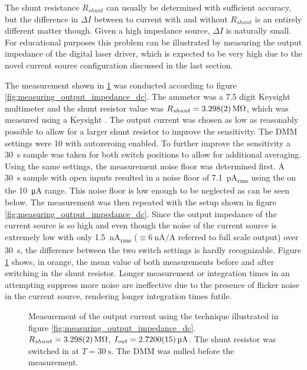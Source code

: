 The shunt resistance $R_{shunt}$ can usually be determined with sufficient accuracy, but the difference in $\Delta I$ between to current with and without $R_{shunt}$ is an entirely different matter though. Given a high impedance source, $\Delta I$ is naturally small. For educational purposes this problem can be illustrated by measuring the output impedance of the digital laser driver, which is expected to be very high due to the novel current source configuration discussed in the last section.

The measurement shown in \ref{fig:dgDrive_output_impedance_dc} was conducted according to figure \ref{fig:measuring_output_impedance_dc}. The ammeter was a \num{7.5} digit Keysight  multimeter and the shunt resistor value was $R_{shunt} = \qty{3.298 \pm 0.002}{\mega\ohm}$, which was measured using a Keysight . The output current was chosen as low as reasonably possible to allow for a larger shunt resistor to improve the sensitivity. The DMM settings were \qty{10}{\plc} with autozeroing enabled. To further improve the sensitivity a \qty{30}{\second} sample was taken for both switch positions to allow for additional averaging. Using the same settings, the measurement noise floor was determined first. A \qty{30}{\second} sample with open inputs resulted in a noise floor of \qty{7.1}{\pA_{rms}} using the  on the \qty{10}{\uA} range. This noise floor is low enough to be neglected as can be seen below. The measurement was then repeated with the setup shown in figure \ref{fig:measuring_output_impedance_dc}. Since the output impedance of the current source is so high and even though the noise of the current source is extremely low with only \qty{1.5}{\nA_{rms}} ($\equiv \qty{6}{\nA \per \A}$ referred to full scale output) over \qty{30}{\s}, the difference between the two switch settings is hardly recognizable. Figure \ref{fig:dgDrive_output_impedance_dc} shows, in orange, the mean value of both measurements before and after switching in the shunt resistor. Longer measurement or integration times in an attempting suppress more noise are ineffective due to the presence of flicker noise in the current source, rendering longer integration times futile.
\begin{figure}[ht]
    \centering
    
    \caption{Measurement of the output current using the technique illustrated in figure \ref{fig:measuring_output_impedance_dc}. $R_{shunt} = \qty{3.298 \pm 0.002}{\mega\ohm}$, $I_{out} = \qty{2.72 \pm 0.0015}{\uA}$. The shunt resistor was switched in at $T = \qty{30}{\s}$. The DMM was nulled before the measurement.}
    \label{fig:dgDrive_output_impedance_dc}
\end{figure}

